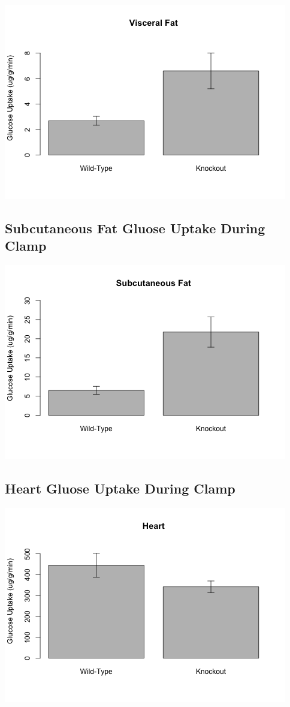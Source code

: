 \documentclass[]{article}
\begin{document}
\includegraphics{figures/v-fat-1.png}

\subsection{Subcutaneous Fat Gluose Uptake During
Clamp}\label{subcutaneous-fat-gluose-uptake-during-clamp}

\includegraphics{figures/s-fat-1.png}

\subsection{Heart Gluose Uptake During
Clamp}\label{heart-gluose-uptake-during-clamp}

\includegraphics{figures/heart-1.png}
\end{document}

